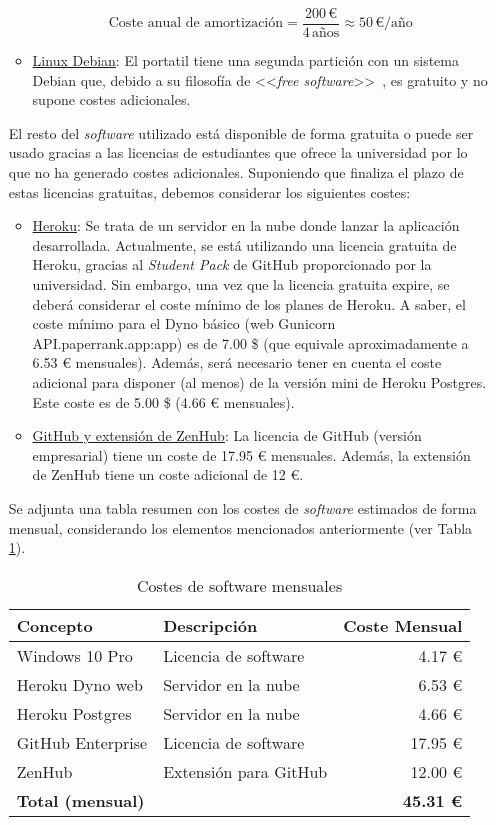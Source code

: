 \begin{enumerate}
\begin{itemize}
        \[
        \text{{Coste anual de amortización}} = \frac{{200 \, \text{{€}}}}{{4 \, \text{{años}}}} \approx 50 \, \text{{€/año}}
        \]

        \item \underline{Linux Debian}: El portatil tiene una segunda partición con un sistema Debian que, debido a su filosofía de <<\textit{free software}>>~\cite{Debian}, es gratuito y no supone costes adicionales.
    \end{itemize}

    El resto del \textit{software} utilizado está disponible de forma gratuita o puede ser usado gracias a las licencias de estudiantes que ofrece la universidad por lo que no ha generado costes adicionales. Suponiendo que finaliza el plazo de estas licencias gratuitas, debemos considerar los siguientes costes:

    \begin{itemize}
        \item \underline{Heroku}: Se trata de un servidor en la nube donde lanzar la aplicación desarrollada. Actualmente, se está utilizando una licencia gratuita de Heroku, gracias al \textit{Student Pack} de GitHub proporcionado por la universidad. Sin embargo, una vez que la licencia gratuita expire, se deberá considerar el coste mínimo de los planes de Heroku. A saber, el coste mínimo para el Dyno básico (web Gunicorn API.paperrank.app:app) es de 7.00 \$ (que equivale aproximadamente a 6.53 € mensuales). Además, será necesario tener en cuenta el coste adicional para disponer (al menos) de la versión mini de Heroku Postgres. Este coste es de 5.00 \$ (4.66 € mensuales).
        \item \underline{GitHub y extensión de ZenHub}: La licencia de GitHub (versión empresarial) tiene un coste de 17.95 € mensuales. Además, la extensión de ZenHub tiene un coste adicional de 12 €.  
    \end{itemize}

    Se adjunta una tabla resumen con los costes de \textit{software} estimados de forma mensual, considerando los elementos mencionados anteriormente (ver Tabla \ref{tab:costes-software}). 

\begin{table}[h]
\centering
\begin{tabularx}{\textwidth}{@{}lXr@{}}
\toprule
\textbf{Concepto} & \textbf{Descripción} & \textbf{Coste Mensual} \\
\midrule
Windows 10 Pro & Licencia de software & 4.17 € \\
Heroku Dyno web & Servidor en la nube & 6.53 € \\
Heroku Postgres & Servidor en la nube & 4.66 € \\
GitHub Enterprise & Licencia de software & 17.95 € \\
ZenHub & Extensión para GitHub & 12.00 € \\
\midrule
\textbf{Total (mensual)} & & \textbf{45.31 €} \\
\bottomrule
\end{tabularx}
\caption{Costes de software mensuales}
\label{tab:costes-software}
\end{table}


\end{enumerate}
